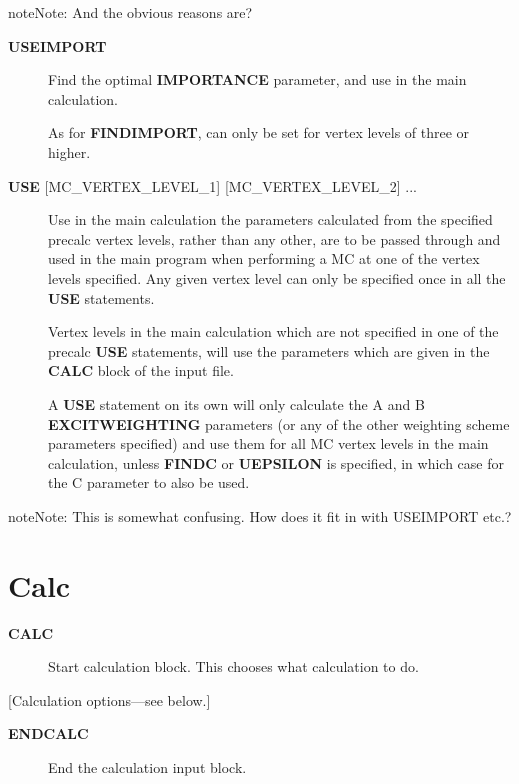 \documentclass[openany,a4paper,10pt,english]{manual}
\begin{document}
\begin{notice}{note}{Note:}
And the obvious reasons are?
\end{notice}
\begin{description}
\item[\textbf{USEIMPORT}] \leavevmode
Find the optimal \textbf{IMPORTANCE} parameter, and use in the main
calculation.

As for \textbf{FINDIMPORT}, can only be set for vertex levels of three
or higher.

\item[\textbf{USE} {[}MC\_VERTEX\_LEVEL\_1{]} {[}MC\_VERTEX\_LEVEL\_2{]} ...] \leavevmode
Use in the main calculation the parameters calculated from the specified precalc
vertex levels, rather than any other, are to be passed through and
used in the main program when performing a MC at one of the vertex
levels specified. Any given vertex level can only be specified once
in all the \textbf{USE} statements.

Vertex levels in the main calculation which are not specified in one of
the precalc \textbf{USE} statements, will
use the parameters which are given in the \textbf{CALC} block of
the input file.

A \textbf{USE} statement on its own will only calculate the
A and B \textbf{EXCITWEIGHTING} parameters (or any of the other weighting
scheme parameters specified) and use them for all MC vertex levels
in the main calculation, unless \textbf{FINDC} or \textbf{UEPSILON} is specified,
in which case for the C parameter to also be used.

\end{description}

\begin{notice}{note}{Note:}
This is somewhat confusing.  How does it fit in with USEIMPORT etc.?
\end{notice}

\resetcurrentobjects
\hypertarget{--doc-input/calc}{}

\hypertarget{input-calc}{}\section{Calc}
\begin{description}
\item[\textbf{CALC}] \leavevmode
Start calculation block.  This chooses what calculation to do.

\end{description}

{[}Calculation options---see below.{]}
\begin{description}
\item[\textbf{ENDCALC}] \leavevmode
End the calculation input block.

\end{description}
\end{document}
